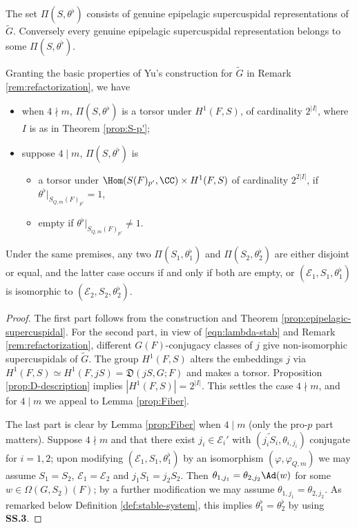 \documentclass[a4paper,10pt]{article}
\begin{document}
\begin{proposition}\label{prop:packet-prop-0}
	The set $\Pi(S, \theta^\flat)$ consists of genuine epipelagic supercuspidal representations of $\tilde{G}$. Conversely every genuine epipelagic supercuspidal representation belongs to some $\Pi(S, \theta^\flat)$.
	
	Granting the basic properties of Yu's construction for $\tilde{G}$ in Remark \ref{rem:refactorization}, we have
	\begin{itemize}
		\item when $4 \nmid m$, $\Pi(S, \theta^\flat)$ is a torsor under $H^1(F, S)$, of cardinality $2^{|I|}$, where $I$ is as in Theorem \ref{prop:S-p'};
		\item suppose $4 \mid m$, $\Pi(S, \theta^\flat)$ is
		\begin{itemize}
			\item a torsor under $\Hom(S(F)_{p'}, \CC) \times H^1(F, S)$ of cardinality $2^{2|I|}$, if $\theta^\flat|_{S_{Q,m}(F)_{p'}}=1$,
			\item empty if $\theta^\flat|_{S_{Q,m}(F)_{p'}} \neq 1$.
		\end{itemize}
	\end{itemize}
	Under the same premises, any two $\Pi(S_1, \theta^\flat_1)$ and $\Pi(S_2, \theta^\flat_2)$ are either disjoint or equal, and the latter case occurs if and only if both are empty, or $(\mathcal{E}_1, S_1, \theta^\flat_1)$ is isomorphic to $(\mathcal{E}_2, S_2, \theta^\flat_2)$.
\end{proposition}
\begin{proof}
	The first part follows from the construction and Theorem \ref{prop:epipelagic-supercuspidal}. For the second part, in view of \eqref{eqn:lambda-stab} and Remark \ref{rem:refactorization}, different $G(F)$-conjugacy classes of $j$ give non-isomorphic supercuspidals of $\tilde{G}$. The group $H^1(F, S)$ alters the embeddings $j$ via $H^1(F, S) \simeq H^1(F, jS) = \mathfrak{D}(j S, G ;F)$ and makes a torsor. Proposition \ref{prop:D-description} implies $|H^1(F, S)| = 2^{|I|}$. This settles the case $4 \nmid m$, and for $4 \mid m$ we appeal to Lemma \ref{prop:Fiber}.

	The last part is clear by Lemma \ref{prop:Fiber} when $4 \mid m$ (only the pro-$p$ part matters). Suppose $4 \nmid m$ and that there exist $j_i \in \mathcal{E}_i'$ with $(\widetilde{j_i S_i}, \theta_{i, j_i})$ conjugate for $i=1,2$; upon modifying $(\mathcal{E}_1, S_1, \theta^\flat_1)$ by an isomorphism $(\varphi, \varphi_{Q,m})$ we may assume $S_1 = S_2$, $\mathcal{E}_1 = \mathcal{E}_2$ and $j_1 S_1 = j_2 S_2$. Then $\theta_{1, j_1} = \theta_{2, j_2} \Ad(w)$ for some $w \in \Omega(G, S_2)(F)$; by a further modification we may assume $\theta_{1, j_1} = \theta_{2, j_2}$. As remarked below Definition \ref{def:stable-system}, this implies $\theta_1^\flat = \theta_2^\flat$ by using \textbf{SS.3}.
\end{proof}
\end{document}
